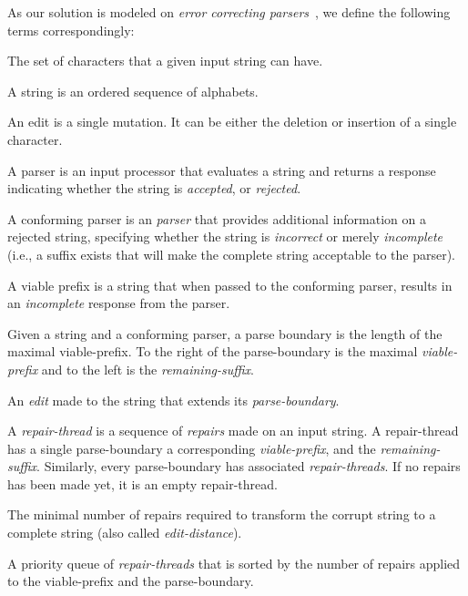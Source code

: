 \documentclass[acmsmall,screen,review,anonymous]{acmart}
\begin{document}
As our solution is modeled on \emph{error correcting parsers}~\cite{aho1972minimum},
we define the following terms correspondingly:
\begin{description}[labelwidth=!, labelindent=0pt]
\item[alphabet] The set of characters that a given input string can have.

\item[string] A string is an ordered sequence of alphabets.

\item[edit] An edit is a single mutation. It can be either the deletion
or insertion of a single character.

\item[parser] A parser is an input processor that evaluates a string and returns
a response indicating whether the string is \emph{accepted}, or \emph{rejected}.

\item[conforming parser] A conforming parser is an \emph{parser} that 
provides additional information on a rejected string, specifying whether
the string is \emph{incorrect} or merely \emph{incomplete} (i.e., a suffix exists that
will make the complete string acceptable to the parser).

\item[viable-prefix] A viable prefix is a string that when passed to the conforming parser,
 results in an \emph{incomplete} response from the parser.

\item[parse-boundary] Given a string and a conforming parser, a parse boundary is the
length of the maximal viable-prefix. To the right of the parse-boundary is the maximal
\emph{viable-prefix} and to the left is the \emph{remaining-suffix}.

\item[repair] An \emph{edit} made to the string that extends its \emph{parse-boundary}.

\item[repair-thread] A \emph{repair-thread} is a sequence of \emph{repairs} made on an
input string. A repair-thread has a single parse-boundary a corresponding
\emph{viable-prefix}, and the \emph{remaining-suffix}.
Similarly, every parse-boundary has associated \emph{repair-threads}.
If no repairs has been made yet, it is an empty repair-thread.

\item[repair-distance] The minimal number of repairs required to transform the corrupt
string to a complete string (also called \emph{edit-distance}).

\item[thread-queue] A priority queue of \emph{repair-threads} that is sorted by the
number of repairs applied to the viable-prefix and the parse-boundary.
\end{description}
\end{document}
